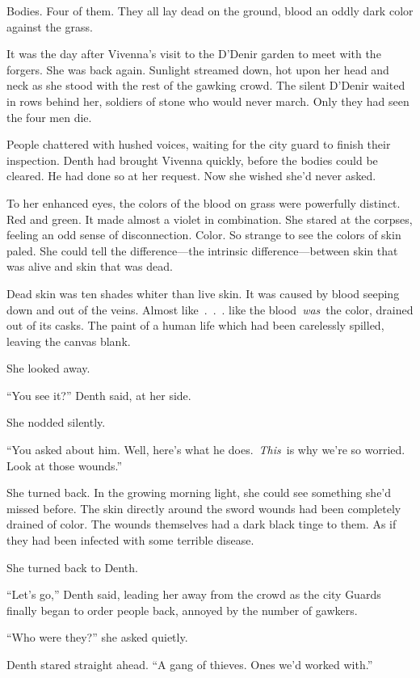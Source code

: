 \orn

Bodies. Four of them. They all lay dead on the ground, blood an oddly dark color against the grass.

It was the day after Vivenna’s visit to the D’Denir garden to meet with the forgers. She was back again. Sunlight streamed down, hot upon her head and neck as she stood with the rest of the gawking crowd. The silent D’Denir waited in rows behind her, soldiers of stone who would never march. Only they had seen the four men die.

People chattered with hushed voices, waiting for the city guard to finish their inspection. Denth had brought Vivenna quickly, before the bodies could be cleared. He had done so at her request. Now she wished she’d never asked.

To her enhanced eyes, the colors of the blood on grass were powerfully distinct. Red and green. It made almost a violet in combination. She stared at the corpses, feeling an odd sense of disconnection. Color. So strange to see the colors of skin paled. She could tell the difference—the intrinsic difference—between skin that was alive and skin that was dead.

Dead skin was ten shades whiter than live skin. It was caused by blood seeping down and out of the veins. Almost like~.~.~. like the blood~\textit{was}~the color, drained out of its casks. The paint of a human life which had been carelessly spilled, leaving the canvas blank.

She looked away.

“You see it?” Denth said, at her side.

She nodded silently.

“You asked about him. Well, here’s what he does.~\textit{This}~is why we’re so worried. Look at those wounds.”

She turned back. In the growing morning light, she could see something she’d missed before. The skin directly around the sword wounds had been completely drained of color. The wounds themselves had a dark black tinge to them. As if they had been infected with some terrible disease.

She turned back to Denth.

“Let’s go,” Denth said, leading her away from the crowd as the city Guards finally began to order people back, annoyed by the number of gawkers.

“Who were they?” she asked quietly.

Denth stared straight ahead. “A gang of thieves. Ones we’d worked with.”

